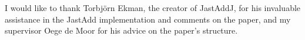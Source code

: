 I would like to thank Torbj\"{o}rn Ekman, the creator of JastAddJ, for 
his invaluable assistance in the JastAdd implementation and comments on the paper, 
and my supervisor Oege de Moor for his advice on the paper's structure.